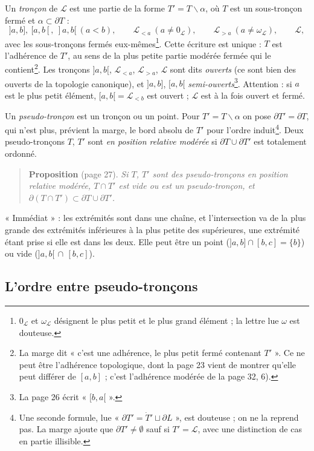 \documentclass[11pt,a4paper]{article}
\begin{document}
Un \emph{tronçon} de $\mathcal{L}$ est une partie de la forme $T' = T
\smallsetminus \alpha$, où $T$ est un sous-tronçon fermé et $\alpha \subset
\partial T$ :
\[
]a,b],\ [a,b[,\ ]a,b[ \ (a < b), \qquad \mathcal{L}_{<a} \ (a \neq
0_{\mathcal{L}}), \qquad \mathcal{L}_{>a} \ (a \neq \omega_{\mathcal{L}}),
\qquad \mathcal{L},
\]
avec les sous-tronçons fermés eux-mêmes\footnote{$0_{\mathcal{L}}$ et
$\omega_{\mathcal{L}}$ désignent le plus petit et le plus grand élément ; la
lettre lue $\omega$ est douteuse.}. Cette écriture est unique : $T$ est
l'adhérence de $T'$, au sens de la plus petite partie modérée fermée qui le
contient\footnote{La marge dit « c'est une adhérence, le plus petit fermé
contenant $T'$ ». Ce ne peut être l'adhérence topologique, dont la page 23 vient
de montrer qu'elle peut différer de $[a,b]$ ; c'est l'adhérence modérée de la
page 32, 6).}. Les tronçons $]a,b[$, $\mathcal{L}_{<a}$, $\mathcal{L}_{>a}$,
$\mathcal{L}$ sont dits \emph{ouverts} (ce sont bien des ouverts de la
topologie canonique), et $]a,b]$, $[a,b[$ \emph{semi-ouverts}\footnote{La page
26 écrit « $[b,a[$ ».}. Attention : si $a$ est le plus petit élément, $[a,b[ =
\mathcal{L}_{<b}$ est ouvert ; $\mathcal{L}$ est à la fois ouvert et fermé.

Un \emph{pseudo-tronçon} est un tronçon ou un point. Pour $T' = T \smallsetminus
\alpha$ on pose $\partial T' = \partial T$, qui n'est plus, prévient la marge, le
bord absolu de $T'$ pour l'ordre induit\footnote{Une seconde formule, lue
« $\partial T' = \dot{T}' \sqcup \partial L$ », est douteuse ; on ne la reprend
pas. La marge ajoute que $\partial T' \neq \emptyset$ sauf si $T' = \mathcal{L}$,
avec une distinction de cas en partie illisible.}. Deux pseudo-tronçons $T$,
$T'$ sont \emph{en position relative modérée} si $\partial T \cup \partial T'$
est totalement ordonné.

\begin{quote}
\textbf{Proposition} (page 27). \emph{Si $T$, $T'$ sont des pseudo-tronçons en
position relative modérée, $T \cap T'$ est vide ou est un pseudo-tronçon, et
$\partial(T \cap T') \subset \partial T \cup \partial T'$.}
\end{quote}

« Immédiat » : les extrémités sont dans une chaîne, et l'intersection va de la
plus grande des extrémités inférieures à la plus petite des supérieures, une
extrémité étant prise si elle est dans les deux. Elle peut être un point
($]a,b] \cap [b,c] = \{b\}$) ou vide ($]a,b[ \,\cap\, [b,c]$).

\subsection*{L'ordre entre pseudo-tronçons}
\end{document}
